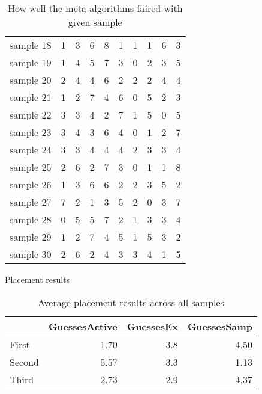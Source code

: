 \begin{table}
\begin{tabular}{lrrrrrrrrr}
sample 18 &             1 &  3 &  6 &         8 &  1 &  1 &           1 &  6 &  3 \\
sample 19 &             1 &  4 &  5 &         7 &  3 &  0 &           2 &  3 &  5 \\
sample 20 &             2 &  4 &  4 &         6 &  2 &  2 &           2 &  4 &  4 \\
sample 21 &             1 &  2 &  7 &         4 &  6 &  0 &           5 &  2 &  3 \\
sample 22 &             3 &  3 &  4 &         2 &  7 &  1 &           5 &  0 &  5 \\
sample 23 &             3 &  4 &  3 &         6 &  4 &  0 &           1 &  2 &  7 \\
sample 24 &             3 &  3 &  4 &         4 &  4 &  2 &           3 &  3 &  4 \\
sample 25 &             2 &  6 &  2 &         7 &  3 &  0 &           1 &  1 &  8 \\
sample 26 &             1 &  3 &  6 &         6 &  2 &  2 &           3 &  5 &  2 \\
sample 27 &             7 &  2 &  1 &         3 &  5 &  2 &           0 &  3 &  7 \\
sample 28 &             0 &  5 &  5 &         7 &  2 &  1 &           3 &  3 &  4 \\
sample 29 &             1 &  2 &  7 &         4 &  5 &  1 &           5 &  3 &  2 \\
sample 30 &             2 &  6 &  2 &         4 &  3 &  3 &           4 &  1 &  5 \\
\bottomrule
\end{tabular}
\caption{Placement results}
\caption*{How well the meta-algorithms faired with given sample}
\end{table}


\begin{table}
\begin{tabular}{lrrr}
\toprule
{} &  GuessesActive &  GuessesEx &  GuessesSamp \\
\midrule
First  &           1.70 &        3.8 &         4.50 \\
Second &           5.57 &        3.3 &         1.13 \\
Third  &           2.73 &        2.9 &         4.37 \\
\bottomrule
\end{tabular}
\caption{Average placement results across all samples}
\end{table}

